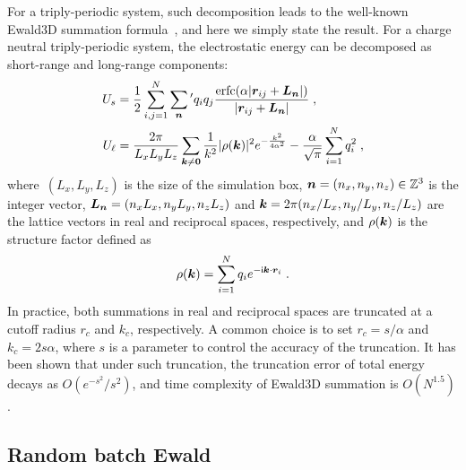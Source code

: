For a triply-periodic system, such decomposition leads to the well-known Ewald3D summation formula~\cite{Ewald1921AnnPhys}, and here we simply state the result.
For a charge neutral triply-periodic system, the electrostatic energy can be decomposed as short-range and long-range components:
\begin{align}
	U_{s} & = \frac{1}{2} \sum_{i, j=1}^N \sum_{\boldsymbol{n}}{}^\prime q_iq_j\frac{\mathrm{erfc}(\alpha\lvert\boldsymbol{r}_{ij}+\boldsymbol{L}_{\bm{n}} \rvert)}{\lvert\boldsymbol{r}_{ij}+ \boldsymbol{L}_{\bm{n}}\rvert} \;, \\
	U_{\ell} & = \frac{2 \pi}{L_x L_y L_z} \sum_{\boldsymbol{k} \neq \boldsymbol{0}} \frac{1}{k^2} \lvert\rho(\boldsymbol{k})\rvert^2 e^{-\frac{k^2}{4\alpha^2}} - \frac{\alpha}{\sqrt{\pi}}\sum_{i=1}^{N}q_i^2\;,
\end{align}
where~$(L_x, L_y, L_z)$ is the size of the simulation box, $\boldsymbol{n} = (n_x, n_y, n_z) \in \mathbb{Z}^3$ is the integer vector, $\boldsymbol{L}_{\boldsymbol{n}} = (n_x L_x, n_y L_y, n_z L_z)$ and $\boldsymbol{k} = 2\pi (n_x /L_x, n_y /L_y, n_z /L_z)$ are the lattice vectors in real and reciprocal spaces, respectively, and $\rho(\boldsymbol{k})$ is the structure factor defined as
\begin{equation}
	\rho(\boldsymbol{k}) = \sum_{i=1}^{N} q_i e^{-\mathsf i \boldsymbol{k}\cdot \boldsymbol{r}_i}\;.
\end{equation}
In practice, both summations in real and reciprocal spaces are truncated at a cutoff radius $r_c$ and $k_{c}$, respectively.
A common choice is to set $r_c = s / \alpha$ and $k_c = 2 s \alpha$, where $s$ is a parameter to control the accuracy of the truncation.
It has been shown that under such truncation, the truncation error of total energy decays as $O(e^{-s^2} / s^{2})$, and time complexity of Ewald3D summation is $O(N^{1.5})$.

\subsection{Random batch Ewald} \label{sec::rbe}

